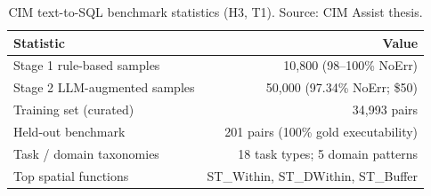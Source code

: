 \begin{table}[t]
  \centering
  \caption{CIM text-to-SQL benchmark statistics (H3, T1). Source: CIM Assist thesis.}
  \label{tab:t1}
  \small
  \begin{tabular}{lr}
    \toprule
    Statistic & Value \\
    \midrule
    Stage 1 rule-based samples & 10,800 (98--100\% NoErr) \\
    Stage 2 LLM-augmented samples & 50,000 (97.34\% NoErr; \$50) \\
    Training set (curated) & 34,993 pairs \\
    Held-out benchmark & 201 pairs (100\% gold executability) \\
    Task / domain taxonomies & 18 task types; 5 domain patterns \\
    Top spatial functions & ST\_Within, ST\_DWithin, ST\_Buffer \\
    \bottomrule
  \end{tabular}
\end{table}
